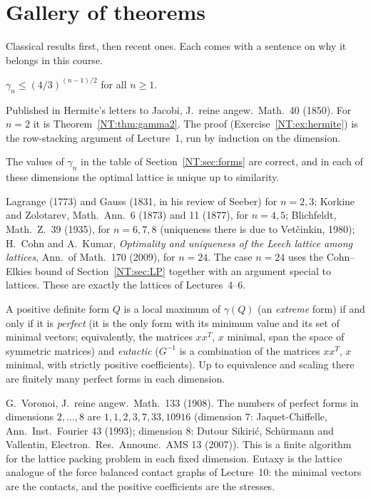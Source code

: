 \section{Gallery of theorems}
\label{NT:sec:gallery}

Classical results first, then recent ones. Each comes with a sentence on why it belongs in this course.

\begin{theorem}\label{NT:gal:hermite}
$\gamma_n\le(4/3)^{(n-1)/2}$ for all $n\ge1$.
\end{theorem}
Published in Hermite's letters to Jacobi, J.\ reine angew.\ Math.\ 40 (1850). For $n=2$ it is
Theorem~\ref{NT:thm:gamma2}. The proof (Exercise~\ref{NT:ex:hermite}) is the row-stacking argument of
Lecture~1, run by induction on the dimension.

\begin{theorem}\label{NT:gal:hermiteknown}
The values of $\gamma_n$ in the table of Section~\ref{NT:sec:forms} are correct, and in each of these
dimensions the optimal lattice is unique up to similarity.
\end{theorem}
Lagrange (1773) and Gauss (1831, in his review of Seeber) for $n=2,3$; Korkine and Zolotarev, Math.\
Ann.\ 6 (1873) and 11 (1877), for $n=4,5$; Blichfeldt, Math.\ Z.\ 39 (1935), for $n=6,7,8$ (uniqueness
there is due to Vet\v{c}inkin, 1980); H.~Cohn and A.~Kumar, \emph{Optimality and uniqueness of the Leech
lattice among lattices}, Ann.\ of Math.\ 170 (2009), for $n=24$. The case $n=24$ uses the Cohn--Elkies
bound of Section~\ref{NT:sec:LP} together with an argument special to lattices. These are exactly the
lattices of Lectures~4--6.

\begin{theorem}[Voronoi 1908]\label{NT:gal:voronoi}
A positive definite form $Q$ is a local maximum of $\gamma(Q)$ (an \emph{extreme} form) if and only if it is
\emph{perfect} (it is the only form with its minimum value and its set of minimal vectors; equivalently,
the matrices $xx^T$, $x$ minimal, span the space of symmetric matrices) and \emph{eutactic} ($G^{-1}$ is a
combination of the matrices $xx^T$, $x$ minimal, with strictly positive coefficients). Up to equivalence and scaling there are finitely many perfect forms in each dimension.
\end{theorem}
G.~Voronoi, J.\ reine angew.\ Math.\ 133 (1908). The numbers of perfect forms in dimensions $2,\dots,8$
are $1,1,2,3,7,33,10916$ (dimension $7$: Jaquet-Chiffelle, Ann.\ Inst.\ Fourier 43 (1993); dimension $8$:
Dutour Sikiri\'c, Schürmann and Vallentin, Electron.\ Res.\ Announc.\ AMS 13 (2007)). This is a finite
algorithm for the lattice packing problem in each fixed dimension. Eutaxy is the lattice analogue of the
force balanced contact graphs of Lecture~10: the minimal vectors are the contacts, and the positive coefficients are
the stresses.


